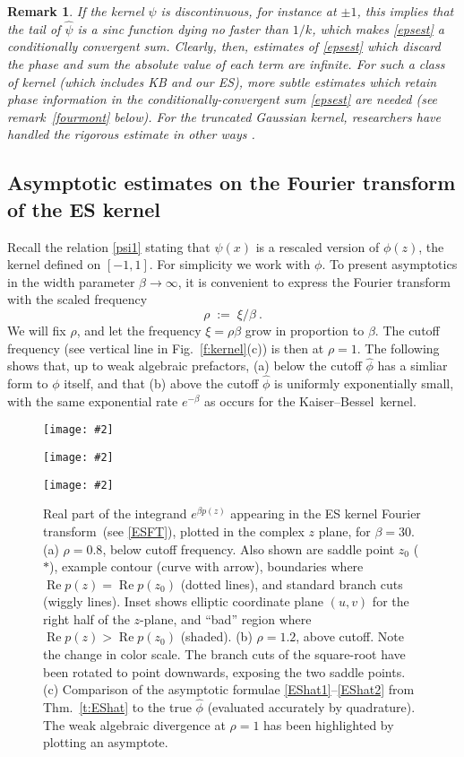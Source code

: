 \documentclass[10pt]{article}
\newcommand{\be}{\begin{equation}}
\newcommand{\ee}{\end{equation}}
\newcommand{\bfi}{\begin{figure}}
\newcommand{\efi}{\end{figure}}
\newcommand{\ca}[2]{\caption{#1 \label{#2}}}
\newcommand{\bmp}[1]{\begin{minipage}{#1}}
\newcommand{\emp}{\end{minipage}}
\newcommand{\pig}[2]{\bmp{#1}\texttt{[image: \#2]}\emp}
\newcommand{\eps}{\varepsilon}
\DeclareMathOperator{\re}{Re}
\newtheorem{rmk}[thm]{Remark}
\newcommand{\freq}{\beta}          %
\newcommand{\KB}{Kaiser--Bessel}
\newcommand{\FT}{Fourier transform}
\begin{document}
\begin{rmk}
  If the kernel $\psi$ is discontinuous, for instance at $\pm1$,
  this implies that the tail of $\hat\psi$
  is a sinc function dying no faster than $1/k$, which makes \eqref{epsest}
  a conditionally convergent sum.
  Clearly, then, estimates of \eqref{epsest}
  which discard the phase and sum the absolute value of each term
  are infinite.
For such a class of kernel (which includes KB and our ES),
more subtle estimates which retain phase information in the
conditionally-convergent sum \eqref{epsest} are needed
(see remark~\ref{fourmont} below).
For the truncated Gaussian kernel, researchers have handled
the rigorous estimate in other ways \cite{nufft,elbel,nfftchap}.
\end{rmk}


\subsection{Asymptotic estimates on the Fourier transform of the ES kernel}
\label{s:asymp}

Recall the relation \eqref{psi1} stating that $\psi(x)$ is a rescaled
version of $\phi(z)$, the kernel defined on $[-1,1]$.
For simplicity we work with $\phi$.
To present asymptotics in the width parameter $\freq\to\infty$,
it is convenient to express the Fourier transform with the scaled frequency
\be
\rho \;:=\; \xi/\freq ~.
\label{rho}
\ee
We will fix $\rho$, and let the frequency $\xi=\rho\freq$ grow in proportion
to $\freq$. The cutoff frequency (see vertical line
in Fig.~\ref{f:kernel}(c)) is then at $\rho=1$.
The following shows that, up to weak algebraic prefactors,
(a) below the cutoff $\hat\phi$ has a simliar form to $\phi$ itself,
and that (b) above the cutoff $\hat\phi$ is uniformly exponentially small,
with the same exponential rate $e^{-\freq}$ as occurs for the \KB\ kernel.

\bfi[t] %
\pig{2.2in}{saddlea_lab}
\pig{2.2in}{saddleb_lab}
\pig{2.2in}{saddleft}
\ca{
  Real part of the integrand $e^{\freq p(z)}$
  appearing in the ES kernel \FT\
  (see \eqref{ESFT}),
  plotted in the complex $z$ plane, for $\freq=30$.
  (a) $\rho=0.8$, below cutoff frequency.
  Also shown are saddle point $z_0$ ($\ast$), example contour (curve with arrow),
  boundaries where $\re p(z) = \re p(z_0)$ (dotted lines),
  and standard branch cuts (wiggly lines).
  Inset shows elliptic coordinate plane $(u,v)$ for the right half of the
  $z$-plane, and ``bad'' region where $\re p(z) > \re p(z_0)$ (shaded).
  (b) $\rho =1.2$, above cutoff.
  Note the change in color scale. The branch cuts of the square-root have
  been rotated to point downwards, exposing the two saddle points.
  (c) Comparison of the asymptotic formulae \eqref{EShat1}--\eqref{EShat2}
  from Thm.~\ref{t:EShat}
  to the true $\hat\phi$ (evaluated accurately by quadrature).
  The weak algebraic divergence at $\rho=1$ has been highlighted by plotting
  an %
  asymptote.
}{f:saddle}
\efi
\end{document}
